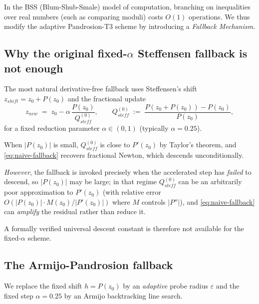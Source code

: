 \documentclass[11pt,a4paper]{article}
\begin{document}
In the BSS (Blum-Shub-Smale) model of computation, branching on inequalities over real numbers (such as comparing moduli) costs $O(1)$ operations. We thus modify the adaptive Pandrosion-T3 scheme by introducing a \textit{Fallback Mechanism}.

\subsection{Why the original fixed-$\alpha$ Steffensen fallback is not enough}\label{sec:why-original-fails}

The most natural derivative-free fallback uses Steffensen's shift $z_{shift} = z_0 + P(z_0)$ and the fractional update
\begin{equation}
z_{new} \;=\; z_0 - \alpha \, \frac{P(z_0)}{Q_{steff}^{(0)}}, \qquad Q_{steff}^{(0)} \;:=\; \frac{P(z_0 + P(z_0)) - P(z_0)}{P(z_0)}, \label{eq:naive-fallback}
\end{equation}
for a fixed reduction parameter $\alpha \in (0, 1)$ (typically $\alpha = 0.25$).

When $|P(z_0)|$ is small, $Q_{steff}^{(0)}$ is close to $P'(z_0)$ by Taylor's theorem, and \eqref{eq:naive-fallback} recovers fractional Newton, which descends unconditionally.

\emph{However}, the fallback is invoked precisely when the accelerated step has \emph{failed} to descend, so $|P(z_0)|$ may be large; in that regime $Q_{steff}^{(0)}$ can be an arbitrarily poor approximation to $P'(z_0)$ (with relative error $O(|P(z_0)| \cdot M(z_0)/|P'(z_0)|)$ where $M$ controls $|P''|$), and \eqref{eq:naive-fallback} can \emph{amplify} the residual rather than reduce it.

A formally verified universal descent constant is therefore not available for the fixed-$\alpha$ scheme.

\subsection{The Armijo-Pandrosion fallback}

We replace the fixed shift $h = P(z_0)$ by an \emph{adaptive} probe radius $\varepsilon$ and the fixed step $\alpha = 0.25$ by an Armijo backtracking line search.
\end{document}
